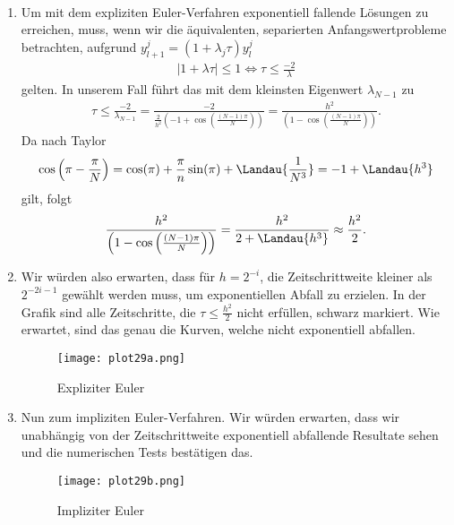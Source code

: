 \begin{solution}
\leavevmode \\
\begin{enumerate}[label = \textbf{\alph*)}]
\item Um mit dem expliziten Euler-Verfahren
exponentiell fallende Lösungen zu erreichen, muss, wenn wir
die äquivalenten, separierten Anfangswertprobleme betrachten,
aufgrund $y_{l + 1}^j = (1 + \lambda_j \tau)y_{l}^j$
\begin{align*}
  |1 + \lambda \tau| \leq 1 \iff \tau \leq \frac{-2}{\lambda}
\end{align*}
gelten. In unserem Fall führt das mit dem kleinsten Eigenwert $\lambda_{N - 1}$ zu
\begin{align*}
  \tau \leq \frac{-2}{\lambda_{N - 1}} =
  \frac{-2}{\frac{2}{h^2}\left(-1 + \cos\left(\frac{(N-1)\pi}{N}\right)\right)}
  =\frac{h^2}{\left(1 - \cos\left(\frac{(N-1)\pi}{N}\right)\right)}.
\end{align*}
Da nach Taylor
\begin{align*}
  \cos\left(\pi - \frac{\pi}{N}\right) = \cos(\pi) + \frac{\pi}{n}\sin(\pi) + \Landau{\frac{1}{N^3}} = -1 + \Landau{h^3}
\end{align*}
gilt, folgt
\begin{align*}
  \frac{h^2}{\left(1 - \cos\left(\frac{(N-1)\pi}{N}\right)\right)} = \frac{h^2}{2 + \Landau{h^3}} \approx \frac{h^2}{2}.
\end{align*}
\item Wir würden also erwarten, dass für $h = 2^{-i}$, die Zeitschrittweite
kleiner als $2^{-2i-1}$ gewählt werden muss, um exponentiellen Abfall zu erzielen.
In der Grafik sind alle Zeitschritte, die $\tau \leq \frac{h^2}{2}$ nicht erfüllen,
schwarz markiert. Wie erwartet, sind das genau die Kurven, welche nicht exponentiell abfallen.
\FloatBarrier
\begin{figure}
    \centering
    \texttt{[image: plot29a.png]}
    \caption{Expliziter Euler}
\end{figure}
\FloatBarrier
\item Nun zum impliziten Euler-Verfahren. Wir würden erwarten, dass wir
unabhängig von der Zeitschrittweite exponentiell abfallende Resultate sehen
und die numerischen Tests bestätigen das.
\begin{figure}
    \centering
    \texttt{[image: plot29b.png]}
    \caption{Impliziter Euler}
\end{figure}
\FloatBarrier
\end{enumerate}
\end{solution}
